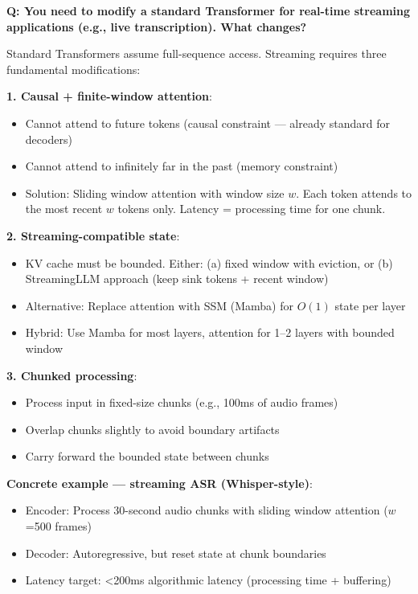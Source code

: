 \begin{interviewq}
\textbf{Q: You need to modify a standard Transformer for real-time streaming applications (e.g., live transcription). What changes?}

 \quad {} \quad \badgefreq{\freqlow}

\stronganswer

Standard Transformers assume full-sequence access. Streaming requires three fundamental modifications:

\textbf{1. Causal + finite-window attention}:
\begin{itemize}
    \item Cannot attend to future tokens (causal constraint --- already standard for decoders)
    \item Cannot attend to infinitely far in the past (memory constraint)
    \item Solution: Sliding window attention with window size $w$. Each token attends to the most recent $w$ tokens only. Latency = processing time for one chunk.
\end{itemize}

\textbf{2. Streaming-compatible state}:
\begin{itemize}
    \item KV cache must be bounded. Either: (a) fixed window with eviction, or (b) StreamingLLM approach (keep sink tokens + recent window)
    \item Alternative: Replace attention with SSM (Mamba) for $O(1)$ state per layer
    \item Hybrid: Use Mamba for most layers, attention for 1--2 layers with bounded window
\end{itemize}

\textbf{3. Chunked processing}:
\begin{itemize}
    \item Process input in fixed-size chunks (e.g., 100ms of audio frames)
    \item Overlap chunks slightly to avoid boundary artifacts
    \item Carry forward the bounded state between chunks
\end{itemize}

\textbf{Concrete example --- streaming ASR (Whisper-style)}:
\begin{itemize}
    \item Encoder: Process 30-second audio chunks with sliding window attention ($w$=500 frames)
    \item Decoder: Autoregressive, but reset state at chunk boundaries
    \item Latency target: <200ms algorithmic latency (processing time + buffering)
\end{itemize}


\end{interviewq}

